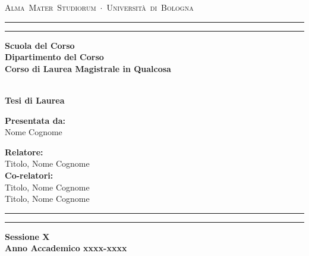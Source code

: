\documentclass[twoside]{report} %
\begin{document}

\thispagestyle{empty}
\begin{titlepage}
\begin{center}
\hspace{0.1cm}\hbox{\Large{\textsc{Alma Mater Studiorum $\cdot$ Universit\`a di Bologna}}}
\vspace{0.5mm}
\begin{spacing}{0.3}
\rule{14.8cm}{0.5mm}
\rule{14.8cm}{0.2mm}
\end{spacing}
\vspace{10mm}
{\small{\bf Scuola del Corso\\
Dipartimento del Corso\\
Corso di Laurea Magistrale in Qualcosa\\
}}
\vspace{27mm}
\begin{spacing}{1.4}
\\
\vspace{16mm} {\large{\bf Tesi di Laurea}}\vspace{2.5cm}
\end{spacing}
\vspace{47mm}
\par
\noindent
\begin{minipage}[t]{0.49\textwidth}
{\large{\bf Presentata da:\\}
Nome Cognome}
\end{minipage}
\hfill
\begin{minipage}[t]{0.49\textwidth}\raggedleft
{\large{\bf Relatore:\\}
Titolo, Nome Cognome\\
\vspace{4mm}
{\bf Co-relatori:\\}
Titolo, Nome Cognome\\
Titolo, Nome Cognome}
\end{minipage}
\vspace{8mm}
\begin{spacing}{0.3}
\rule{14.8cm}{0.2mm}
\rule{14.8cm}{0.5mm}
\end{spacing}
\vspace{5mm}
{\large{\bf Sessione X \\
Anno Accademico xxxx-xxxx}}
\end{center}
\end{titlepage}
\end{document}
